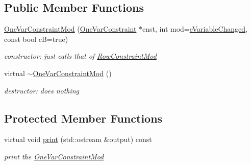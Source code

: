 \subsection*{Public Member Functions}
\begin{DoxyCompactItemize}
\item 
\mbox{\label{class_s_m_spp__di__unipi__it_1_1_one_var_constraint_mod_a30947890a8743a24b5f714154d0ee74f}} 
\mbox{\hyperlink{class_s_m_spp__di__unipi__it_1_1_one_var_constraint_mod_a30947890a8743a24b5f714154d0ee74f}{One\+Var\+Constraint\+Mod}} (\mbox{\hyperlink{class_s_m_spp__di__unipi__it_1_1_one_var_constraint}{One\+Var\+Constraint}} $\ast$cnst, int mod=\mbox{\hyperlink{class_s_m_spp__di__unipi__it_1_1_one_var_constraint_mod_a354f6f78be692d52cb82cf60b7d76df5ac8b7b788644f69a75175d763fed394e3}{e\+Variable\+Changed}}, const bool cB=true)
\begin{DoxyCompactList}\small\item\em constructor\+: just calls that of \mbox{\hyperlink{class_s_m_spp__di__unipi__it_1_1_row_constraint_mod}{Row\+Constraint\+Mod}} \end{DoxyCompactList}\item 
\mbox{\label{class_s_m_spp__di__unipi__it_1_1_one_var_constraint_mod_aee719f047cd87a115f363129f61e1168}} 
virtual \mbox{\hyperlink{class_s_m_spp__di__unipi__it_1_1_one_var_constraint_mod_aee719f047cd87a115f363129f61e1168}{$\sim$\+One\+Var\+Constraint\+Mod}} ()
\begin{DoxyCompactList}\small\item\em destructor\+: does nothing \end{DoxyCompactList}\end{DoxyCompactItemize}
\subsection*{Protected Member Functions}
\begin{DoxyCompactItemize}
\item 
\mbox{\label{class_s_m_spp__di__unipi__it_1_1_one_var_constraint_mod_a2e7b9c9148a98c5c342e8c25cac95926}} 
virtual void \mbox{\hyperlink{class_s_m_spp__di__unipi__it_1_1_one_var_constraint_mod_a2e7b9c9148a98c5c342e8c25cac95926}{print}} (std\+::ostream \&output) const
\begin{DoxyCompactList}\small\item\em print the \mbox{\hyperlink{class_s_m_spp__di__unipi__it_1_1_one_var_constraint_mod}{One\+Var\+Constraint\+Mod}} \end{DoxyCompactList}\end{DoxyCompactItemize}
